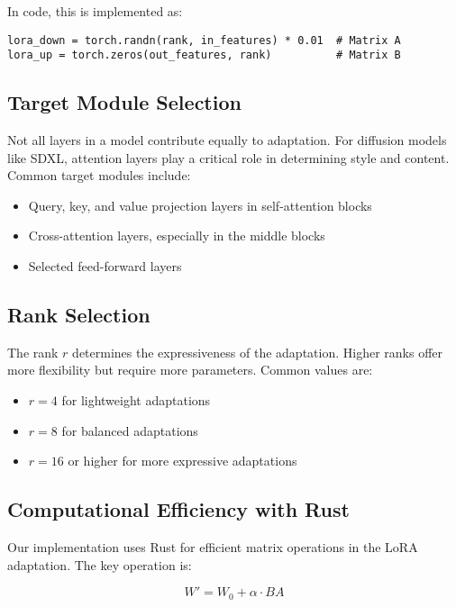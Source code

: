 \documentclass{article}
\begin{document}
In code, this is implemented as:

\begin{verbatim}
lora_down = torch.randn(rank, in_features) * 0.01  # Matrix A
lora_up = torch.zeros(out_features, rank)          # Matrix B
\end{verbatim}

\subsection{Target Module Selection}

Not all layers in a model contribute equally to adaptation. For diffusion models like SDXL, attention layers play a critical role in determining style and content. Common target modules include:

\begin{itemize}
    \item Query, key, and value projection layers in self-attention blocks
    \item Cross-attention layers, especially in the middle blocks
    \item Selected feed-forward layers
\end{itemize}

\subsection{Rank Selection}

The rank $r$ determines the expressiveness of the adaptation. Higher ranks offer more flexibility but require more parameters. Common values are:

\begin{itemize}
    \item $r=4$ for lightweight adaptations
    \item $r=8$ for balanced adaptations
    \item $r=16$ or higher for more expressive adaptations
\end{itemize}

\subsection{Computational Efficiency with Rust}

Our implementation uses Rust for efficient matrix operations in the LoRA adaptation. The key operation is:

\begin{equation}
W' = W_0 + \alpha \cdot BA
\end{equation}
\end{document}
